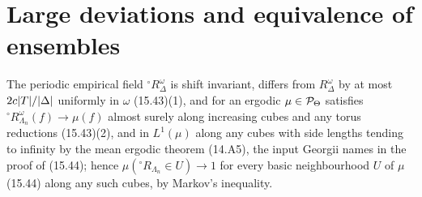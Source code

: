 \section{Large deviations and equivalence of ensembles}

\begin{definition}
    \label{def:ld-15-41}
    \leanok

    The periodic empirical field ${}^\circ R^\omega_\Delta$ is shift invariant, differs from $R^\omega_\Delta$
    by at most $2c\lvert T\rvert/\lvert \Delta\rvert$ uniformly in $\omega$ (15.43)(1), and for an ergodic
    $\mu \in \mathcal{P}_\Theta$ satisfies ${}^\circ R^\omega_{\Lambda_n}(f) \to \mu(f)$ almost surely along
    increasing cubes and any torus reductions (15.43)(2), and in $L^1(\mu)$ along any cubes
    with side lengths tending to infinity by the mean ergodic theorem (14.A5), the input Georgii
    names in the proof of (15.44); hence $\mu({}^\circ R_{\Lambda_n} \in U) \to 1$ for every basic
    neighbourhood $U$ of $\mu$ (15.44) along any such cubes, by Markov's inequality.
\end{definition}

